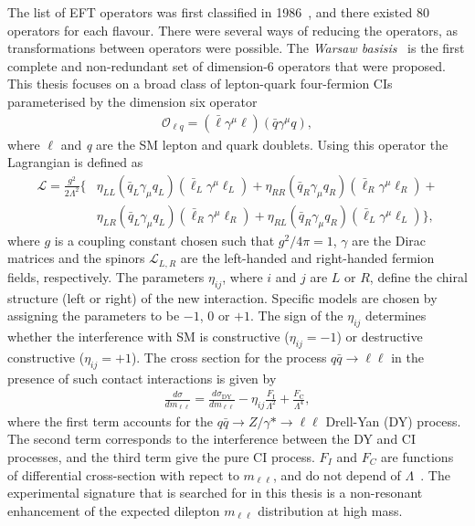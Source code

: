 The list of EFT operators was first classified in 1986~\cite{Buchmuller:163116}, and there existed 80 operators for each flavour. There were several ways of reducing the operators, as transformations between operators were possible. The \emph{Warsaw basisis}~\cite{Grzadkowski_2010} is the first complete and non-redundant set of dimension-6 operators that were proposed. This thesis focuses on a broad class of lepton-quark four-fermion CIs parameterised by the dimension six operator~\cite{de_Blas_2013}
\begin{equation}
    \label{eq:CIop}
    \begin{aligned}
        \mathcal{O}_{\ell q} = (\bar{\ell}\gamma^\mu \ell)(\bar{q}\gamma^\mu q),
     \end{aligned}
\end{equation}
where $\ell$ and \emph{q} are the SM lepton and quark doublets. Using this operator the Lagrangian is defined as 
\begin{equation}
\label{eq:CIlagrangian}
\begin{aligned}
\mathcal L = \frac{g^2}{2\Lambda^2} \{
    &\eta_{LL}\left(\bar{q}_L\gamma_{\mu}q_L\right)\left(\bar{\ell}_L\gamma^{\mu}\ell_L\right) + \eta_{RR}\left(\bar{q}_R\gamma_{\mu}q_R\right)\left(\bar{\ell}_R\gamma^{\mu}\ell_R\right) + \\
    &\eta_{LR}\left(\bar{q}_L\gamma_{\mu}q_L\right)\left(\bar{\ell}_R\gamma^{\mu}\ell_R\right) + \eta_{RL}\left(\bar{q}_R\gamma_{\mu}q_R\right)\left(\bar{\ell}_L\gamma^{\mu}\ell_L\right)\},
\end{aligned}
\end{equation}
where $g$ is a coupling constant chosen such that $g^2/4\pi = 1$, $\gamma$ are the Dirac matrices and the spinors $\mathcal{L}_{L,R}$ are the left-handed and right-handed fermion fields, respectively. The parameters $\eta_{ij}$, where $i$ and $j$ are $L$ or $R$, define the chiral structure (left or right) of the new interaction. Specific models are chosen by assigning the parameters to be $-1$, $0$ or $+1$. The sign of the $\eta_{ij}$ determines whether the interference with SM is constructive ($\eta_{ij} = -1$) or destructive constructive ($\eta_{ij} = +1$). The cross section for the process $q\bar{q} \rightarrow \ell\ell$ in the presence of such contact interactions is given by
\begin{eqnarray}
    \frac{d\sigma}{dm_{\ell\ell}} = \frac{d\sigma_\textrm{DY}}{dm_{\ell\ell}} - \eta_{ij}\frac{F_\textrm{I}}{\Lambda^2} + \frac{F_\textrm{C}}{\Lambda^4},
    \label{eq:cross_section_CI}
\end{eqnarray}
where the first term accounts for the $q\bar{q} \rightarrow Z/\gamma* \rightarrow \ell\ell$ Drell-Yan (DY) process. The second term corresponds to the interference between the DY and CI processes, and the third term give the pure CI process. $F_I$ and $F_C$ are functions of differential cross-section with repect to $m_{\ell\ell}$, and do not depend of $\Lambda$~\cite{Eichten:1984eu}. The experimental signature that is searched for in this thesis is a non-resonant enhancement of the expected dilepton $m_{\ell\ell}$ distribution at high mass. 

